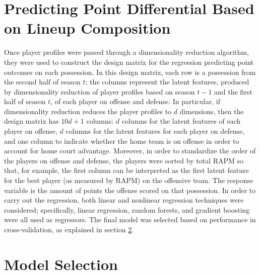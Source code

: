 \section{Predicting Point Differential Based on Lineup Composition}
\label{sec:regress}

Once player profiles were passed through a dimensionality reduction algorithm, they
were used to construct the design matrix for the regression predicting point
outcomes on each possession. In this design matrix, each row is a possession from
the second half of season $t$; the columns represent the latent features, produced
by dimensionality reduction of player profiles based on season $t-1$ and the first
half of season $t$, of each player on offense and defense. In particular, if
dimensionality reduction reduces the player profiles to $d$ dimensions, then the
design matrix has $10d + 1$ columns: $d$ columns for the latent features of each
player on offense, $d$ columns for the latent features for each player on defense,
and one column to indicate whether the home team is on offense in order to account
for home court advantage. Moreover, in order to standardize the order of the players
on offense and defense, the players were sorted by total RAPM so that, for example,
the first column can be interpreted as the first latent feature for the best player
(as measured by RAPM) on the offensive team. The response variable is the amount of
points the offense scored on that possession. In order to carry out the regression,
both linear and nonlinear regression techniques were considered; specifically,
linear regression, random forests, and gradient boosting were all used as
regressors. The final model was selected based on performance in cross-validation,
as explained in section \ref{sec:mod_sel}.

\section{Model Selection}
\label{sec:mod_sel}

